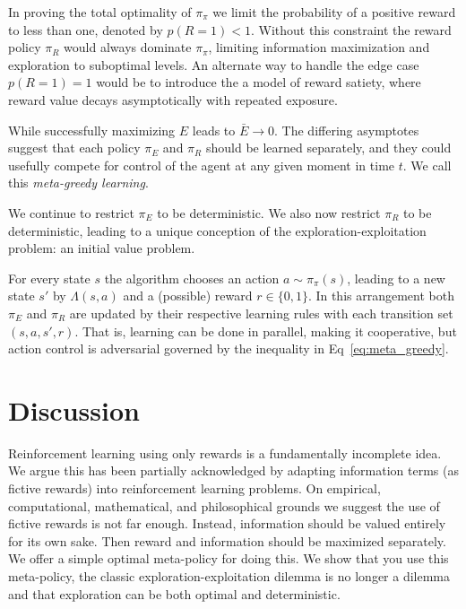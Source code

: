 \documentclass[9pt,twocolumn,twoside]{pnas-new}
\begin{document}
In proving the total optimality of $\pi_{\pi}$ we limit the probability of a positive reward to less than one, denoted by $p(R = 1) < 1$. Without this constraint the reward policy $\pi_R$ would always dominate $\pi_{\pi}$, limiting information maximization and exploration to suboptimal levels. An alternate way to handle the edge case $p(R = 1) = 1$ would be to introduce the a model of reward satiety, where reward value decays asymptotically with repeated exposure. %


While successfully maximizing $E$ leads to $\bar E \rightarrow 0$. The differing asymptotes suggest that each policy $\pi_E$ and $\pi_R$ should be learned separately, and they could usefully compete for control of the agent at any given moment in time $t$. We call this \textit{meta-greedy learning}.

We continue to restrict $\pi_E$ to be deterministic. We also now restrict $\pi_R$ to be deterministic, leading to a unique conception of the exploration-exploitation problem: an initial value problem. 

For every state $s$ the algorithm chooses an action $a \sim \pi_{\pi}(s)$, leading to a new state $s'$ by $\Lambda(s, a)$ and a (possible) reward $r \in \{0,1\}$. In this arrangement both $\pi_E$ and $\pi_R$ are updated by their respective learning rules with each transition set $(s, a, s', r)$. That is, learning can be done in parallel, making it cooperative, but action control is adversarial governed by the inequality in Eq~\ref{eq:meta_greedy}.

\section{Discussion}
Reinforcement learning using only rewards is a fundamentally incomplete idea. We argue this has been partially acknowledged by adapting information terms (as fictive rewards) into reinforcement learning problems. On empirical, computational, mathematical, and philosophical grounds we suggest the use of fictive rewards is not far enough. Instead, information should be valued entirely for its own sake. Then reward and information should be maximized separately. We offer a simple optimal meta-policy for doing this. We show that you use this meta-policy, the classic exploration-exploitation dilemma is no longer a dilemma and that exploration can be both optimal and deterministic.
\end{document}

